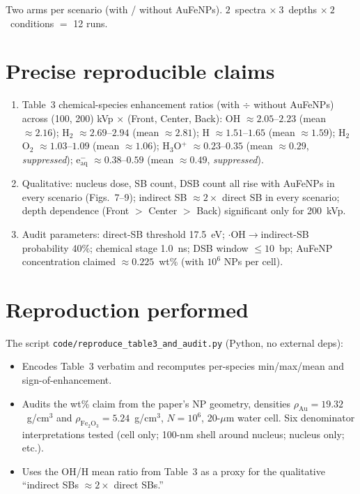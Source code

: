 \documentclass[11pt]{article}
\begin{document}
Two arms per scenario (with / without AuFeNPs). $2$~spectra $\times\ 3$~depths $\times\ 2$~conditions
$=$ 12 runs.

\section{Precise reproducible claims}

\begin{enumerate}
\item Table~3 chemical-species enhancement ratios (with $\div$ without AuFeNPs) across
      (100, 200) kVp $\times$ (Front, Center, Back):
      OH $\approx 2.05$--$2.23$ (mean $\approx 2.16$);
      H$_2$ $\approx 2.69$--$2.94$ (mean $\approx 2.81$);
      H $\approx 1.51$--$1.65$ (mean $\approx 1.59$);
      H$_2$O$_2$ $\approx 1.03$--$1.09$ (mean $\approx 1.06$);
      H$_3$O$^+$ $\approx 0.23$--$0.35$ (mean $\approx 0.29$, \emph{suppressed});
      e$_\text{aq}^-$ $\approx 0.38$--$0.59$ (mean $\approx 0.49$, \emph{suppressed}).
\item Qualitative: nucleus dose, SB count, DSB count all rise with AuFeNPs in every scenario
      (Figs.~7--9); indirect SB $\approx 2\times$ direct SB in every scenario; depth
      dependence (Front $>$ Center $>$ Back) significant only for 200~kVp.
\item Audit parameters: direct-SB threshold 17.5~eV; $\cdot$OH$\to$indirect-SB probability 40\%;
      chemical stage 1.0~ns; DSB window $\leq 10$~bp; AuFeNP concentration claimed
      $\approx 0.225$~wt\% (with $10^6$ NPs per cell).
\end{enumerate}

\section{Reproduction performed}

The script \verb|code/reproduce_table3_and_audit.py| (Python, no external deps):
\begin{itemize}
\item Encodes Table~3 verbatim and recomputes per-species min/max/mean and sign-of-enhancement.
\item Audits the wt\% claim from the paper's NP geometry, densities
      $\rho_\text{Au}=19.32$~g/cm$^3$ and $\rho_{\text{Fe}_2\text{O}_3}=5.24$~g/cm$^3$,
      $N=10^6$, 20-$\mu$m water cell. Six denominator interpretations tested
      (cell only; 100-nm shell around nucleus; nucleus only; etc.).
\item Uses the OH/H mean ratio from Table~3 as a proxy for the qualitative
      ``indirect SBs $\approx 2\times$ direct SBs.''
\end{itemize}
\end{document}
